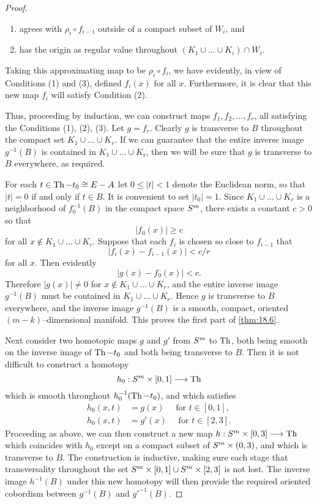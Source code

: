 \documentclass[../main]{subfiles}
\begin{document}
\begin{proof}
\begin{enumerate}[label=(\alph*)]
    \item agrees with $\rho_i \circ f_{i - 1}$ outside of a compact subset of $W_i$, and
    \item has the origin as regular value throughout $(K_1 \cup \ldots \cup K_i) \cap W_i$.
\end{enumerate}

Taking this approximating map to be $\rho_i \circ f_i$, we have evidently, in view of Conditions (1) and (3), defined $f_i(x)$ for all $x$. Furthermore, it is clear that this new map $f_i$ will satisfy Condition (2). 

Thus, proceeding by induction, we can construct maps $f_1, f_2, \ldots, f_r$, all satisfying the Conditions (1), (2), (3). Let $g = f_r$. Clearly $g$ is transverse to $B$ throughout the compact set $K_{1} \cup \ldots \cup K_{r}$. If we can guarantee that the entire inverse image $g^{-1}(B)$ is contained in $K_{1} \cup \ldots \cup K_{\mathrm{r}}$, then we will be sure that $g$ is transverse to $B$ everywhere, as required.

For each $t \in \operatorname{Th} - t_0 \cong E - A$ let $0 \le |t| < 1$ denote the Euclidean norm, so that $|t| = 0$ if and only if $t \in B$. It is convenient to set $|t_0| = 1$. Since $K_1 \cup \ldots \cup K_r$ is a neighborhood of $f_0^{-1}(B)$ in the compact space $S^m$, there exists a constant $c > 0$ so that \[|f_0(x)| \ge c\] for all $x \not \in K_1 \cup \ldots \cup K_r$. Suppose that each $f_i$ is chosen so close to $f_{i - 1}$ that \[|f_i(x) - f_{i - 1}(x)| < c/r\] for all $x$. Then evidently \[|g(x) - f_0(x)| < c.\] Therefore $|g(x)| \ne 0$ for $x \not \in K_1 \cup \ldots \cup K_r$, and the entire inverse image $g^{-1}(B)$ must be contained in $K_1 \cup \ldots \cup K_r$. Hence $g$ is transverse to $B$ everywhere, and the inverse image $g^{-1}(B)$ is a smooth, compact, oriented $(m - k)$--dimensional manifold. This proves the first part of \ref{thm:18.6}. 

Next consider two homotopic maps $g$ and $g'$ from $S^m$ to $\operatorname{Th}$, both being smooth on the inverse image of $\operatorname{Th} - t_0$ and both being transverse to $B$. Then it is not difficult to construct a homotopy \[h_0 : S^m \times [0, 1] \longrightarrow \operatorname{Th}\] which is smooth throughout $h_0^{-1}(\operatorname{Th} - t_0)$, and which satisfies
\begin{align*}
h_0(x, t) & = g(x) \quad \text { for } t \in [0, 1], \\ h_0(x, t) & = g'(x) \quad \text { for } t \in [2, 3].
\end{align*}
Proceeding as above, we can then construct a new map $h : S^m \times [0, 3] \longrightarrow \operatorname{Th}$ which coincides with $h_0$ except on a compact subset of $S^m \times (0, 3)$, and which is transverse to $B$. The construction is inductive, making sure each stage that transversality throughout the set $S^m \times [0, 1] \cup S^m \times [2, 3]$ is not lost. The inverse image $h^{-1}(B)$ under this new homotopy will then provide the required oriented cobordism between $g^{-1}(B)$ and ${g'}^{-1}(B)$. 


\end{proof}
\end{document}
